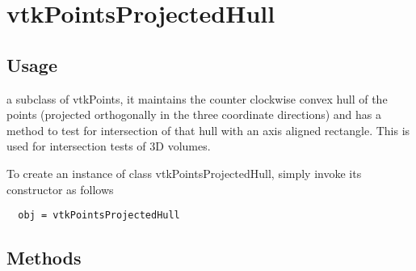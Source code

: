 \section{vtkPointsProjectedHull}

\subsection{Usage}

    a subclass of vtkPoints, it maintains the counter clockwise 
    convex hull of the points (projected orthogonally in the 
    three coordinate directions) and has a method to
    test for intersection of that hull with an axis aligned
    rectangle.  This is used for intersection tests of 3D volumes.

To create an instance of class vtkPointsProjectedHull, simply
invoke its constructor as follows
\begin{verbatim}
  obj = vtkPointsProjectedHull
\end{verbatim}
\subsection{Methods}

